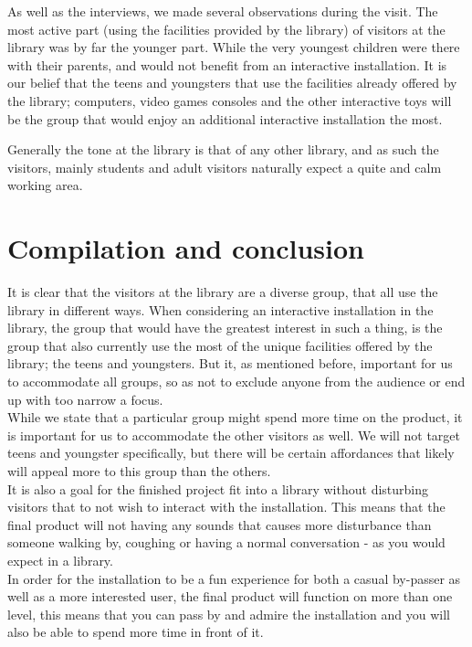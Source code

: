 As well as the interviews, we made several observations during the visit. The most active part (using the facilities provided by the library) of visitors at the library was by far the younger part. While the very youngest children were there with their parents, and would not benefit from an interactive installation. It is our belief that the teens and youngsters that use the facilities already offered by the library; computers, video games consoles and the other interactive toys  will be the group that would enjoy an additional interactive installation the most.

Generally the tone at the library is that of any other library, and as such the visitors, mainly students and adult visitors naturally expect a quite and calm working area.

\section{Compilation and conclusion}

It is clear that the visitors at the library are a diverse group, that all use the library in different ways. When considering an interactive installation in the library, the group that would have the greatest interest in such a thing, is the group that also currently use the most of the unique facilities offered by the library; the teens and youngsters. But it, as mentioned before, important for us to accommodate all groups, so as not to exclude anyone from the audience or end up with too narrow a focus.
\\
While we state that a particular group might spend more time on the product, it is important for us to accommodate the other visitors as well. We will not target teens and youngster specifically, but there will be certain affordances that likely will appeal more to this group than the others.
\\
It is also a goal for the finished project fit into a library without disturbing visitors that to not wish to interact with the installation. This means that the final product will not having any sounds that causes more disturbance than someone walking by, coughing or having a normal conversation - as you would expect in a library.
\\
In order for the installation to be a fun experience for both a casual by-passer as well as a more interested user, the final product will function on more than one level, this means that you can pass by and admire the installation and you will also be able to spend more time in front of it.